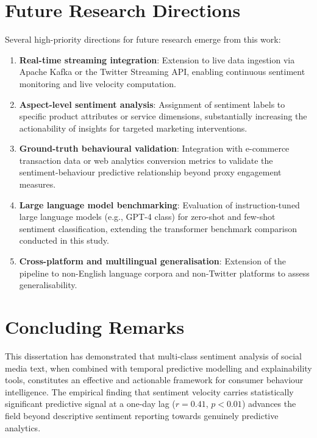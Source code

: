 \section{Future Research Directions}

Several high-priority directions for future research emerge from this work:

\begin{enumerate}
  \item \textbf{Real-time streaming integration}: Extension to live data ingestion via Apache Kafka or the Twitter Streaming API, enabling continuous sentiment monitoring and live velocity computation.

  \item \textbf{Aspect-level sentiment analysis}: Assignment of sentiment labels to specific product attributes or service dimensions, substantially increasing the actionability of insights for targeted marketing interventions.

  \item \textbf{Ground-truth behavioural validation}: Integration with e-commerce transaction data or web analytics conversion metrics to validate the sentiment-behaviour predictive relationship beyond proxy engagement measures.

  \item \textbf{Large language model benchmarking}: Evaluation of instruction-tuned large language models (e.g., GPT-4 class) for zero-shot and few-shot sentiment classification, extending the transformer benchmark comparison conducted in this study.

  \item \textbf{Cross-platform and multilingual generalisation}: Extension of the pipeline to non-English language corpora and non-Twitter platforms to assess generalisability.
\end{enumerate}

\section{Concluding Remarks}

This dissertation has demonstrated that multi-class sentiment analysis of social media text, when combined with temporal predictive modelling and explainability tools, constitutes an effective and actionable framework for consumer behaviour intelligence. The empirical finding that sentiment velocity carries statistically significant predictive signal at a one-day lag ($r = 0.41$, $p < 0.01$) advances the field beyond descriptive sentiment reporting towards genuinely predictive analytics.

